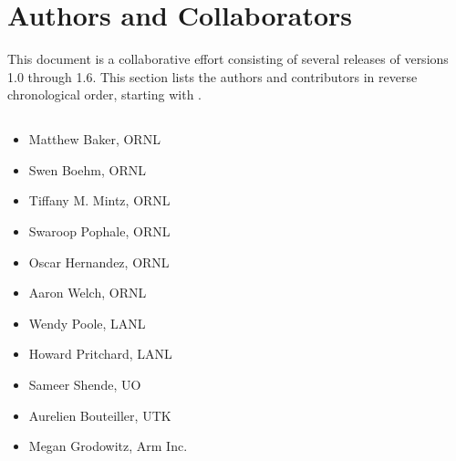 \section*{Authors and Collaborators}
This document is a collaborative effort consisting of several releases of \openshmem versions 1.0 through 1.6. This section lists the authors and contributors in reverse chronological order, starting with .

\subsection*{}
\begin{multicols}{2}
\begin{itemize}
\setlength\itemsep{0.1em}


\item Matthew Baker, \ac{ORNL}                             %
\item Swen Boehm, \ac{ORNL}                                %
\item Tiffany M. Mintz, \ac{ORNL}                          %
\item Swaroop Pophale, \ac{ORNL}                           %
\item Oscar Hernandez, \ac{ORNL}                           %
\item Aaron Welch, \ac{ORNL}                               %

\item Wendy Poole, \ac{LANL}                               %
\item Howard Pritchard, \ac{LANL}                          %

\item Sameer Shende, \ac{UO}                               %

\item Aurelien Bouteiller, \ac{UTK}                        %

\item Megan Grodowitz, Arm Inc.                            %




\end{itemize}
\end{multicols}
